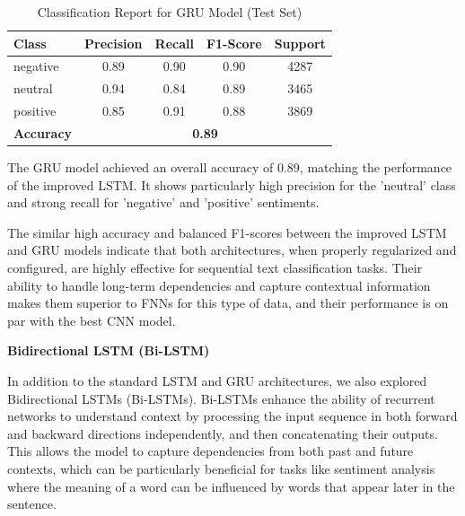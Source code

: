 \begin{table}[H]
\centering
\caption{Classification Report for GRU Model (Test Set)}
\begin{tabular}{|l|c|c|c|c|}
\hline
\textbf{Class} & \textbf{Precision} & \textbf{Recall} & \textbf{F1-Score} & \textbf{Support} \\
\hline
negative & 0.89 & 0.90 & 0.90 & 4287 \\
neutral  & 0.94 & 0.84 & 0.89 & 3465 \\
positive & 0.85 & 0.91 & 0.88 & 3869 \\
\hline
\textbf{Accuracy} & \multicolumn{4}{|c|}{\textbf{0.89}} \\

\hline
\end{tabular}
\label{tab:gru_classification_report}
\end{table}

The GRU model achieved an overall accuracy of 0.89, matching the performance of the improved LSTM. It shows particularly high precision for the 'neutral' class and strong recall for 'negative' and 'positive' sentiments.

The similar high accuracy and balanced F1-scores between the improved LSTM and GRU models indicate that both architectures, when properly regularized and configured, are highly effective for sequential text classification tasks. Their ability to handle long-term dependencies and capture contextual information makes them superior to FNNs for this type of data, and their performance is on par with the best CNN model.

\textbf{Bidirectional LSTM (Bi-LSTM)}

In addition to the standard LSTM and GRU architectures, we also explored Bidirectional LSTMs (Bi-LSTMs). Bi-LSTMs enhance the ability of recurrent networks to understand context by processing the input sequence in both forward and backward directions independently, and then concatenating their outputs. This allows the model to capture dependencies from both past and future contexts, which can be particularly beneficial for tasks like sentiment analysis where the meaning of a word can be influenced by words that appear later in the sentence.

